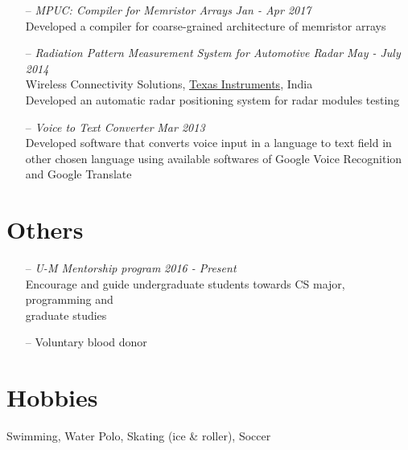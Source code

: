 \documentclass[margin,line,letter]{resume}
\begin{document}
\begin{resume}
\begin{itemize}[leftmargin=*]
    \item[--] \textit{MPUC: Compiler for Memristor Arrays} \hfill \emph{Jan - Apr 2017} \\ Developed a compiler for coarse-grained architecture of memristor arrays
    
    \item[--] \textit{Radiation Pattern Measurement System for Automotive Radar} \hfill \emph{May - July 2014} \\
    Wireless Connectivity Solutions, \href{http://www.ti.com/}{Texas Instruments}, India \\
    Developed an automatic radar positioning system for radar modules testing 
    
    \item[--] \textit{Voice to Text Converter} \hfill \emph{Mar 2013} \\ Developed software that converts voice input in a language to text field in other chosen language using available softwares of Google Voice Recognition and Google Translate
    

 

    \end{itemize}

\section{\mysidestyle Others}
    \noindent
    \begin{itemize}[leftmargin=*]
    \item[--] \textit{U-M Mentorship program} \hfill \emph{2016 - Present}\\
    Encourage and guide undergraduate students towards CS major, programming and \\ graduate studies
    \item[--] Voluntary blood donor
    \end{itemize}
    
\section{\mysidestyle Hobbies}
    Swimming, Water Polo, Skating (ice \& roller), Soccer

\end{resume}
\end{document}
